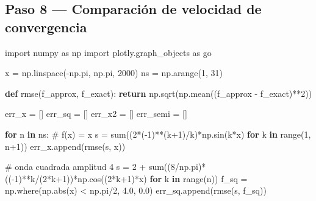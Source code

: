 \documentclass[
  letterpaper,
  DIV=11,
  numbers=noendperiod]{scrreprt}
\newenvironment{Shaded}{\begin{snugshade}}{\end{snugshade}}
\newcommand{\BuiltInTok}[1]{\textcolor[rgb]{0.00,0.23,0.31}{#1}}
\newcommand{\CommentTok}[1]{\textcolor[rgb]{0.37,0.37,0.37}{#1}}
\newcommand{\ControlFlowTok}[1]{\textcolor[rgb]{0.00,0.23,0.31}{\textbf{#1}}}
\newcommand{\DecValTok}[1]{\textcolor[rgb]{0.68,0.00,0.00}{#1}}
\newcommand{\FloatTok}[1]{\textcolor[rgb]{0.68,0.00,0.00}{#1}}
\newcommand{\ImportTok}[1]{\textcolor[rgb]{0.00,0.46,0.62}{#1}}
\newcommand{\KeywordTok}[1]{\textcolor[rgb]{0.00,0.23,0.31}{\textbf{#1}}}
\newcommand{\NormalTok}[1]{\textcolor[rgb]{0.00,0.23,0.31}{#1}}
\newcommand{\OperatorTok}[1]{\textcolor[rgb]{0.37,0.37,0.37}{#1}}
\begin{document}
\subsection{Paso 8 --- Comparación de velocidad de
convergencia}\label{paso-8-comparaciuxf3n-de-velocidad-de-convergencia}

\begin{Shaded}
\begin{Highlighting}[]
\ImportTok{import}\NormalTok{ numpy }\ImportTok{as}\NormalTok{ np}
\ImportTok{import}\NormalTok{ plotly.graph\_objects }\ImportTok{as}\NormalTok{ go}

\NormalTok{x  }\OperatorTok{=}\NormalTok{ np.linspace(}\OperatorTok{{-}}\NormalTok{np.pi, np.pi, }\DecValTok{2000}\NormalTok{)}
\NormalTok{ns }\OperatorTok{=}\NormalTok{ np.arange(}\DecValTok{1}\NormalTok{, }\DecValTok{31}\NormalTok{)}

\KeywordTok{def}\NormalTok{ rmse(f\_approx, f\_exact):}
    \ControlFlowTok{return}\NormalTok{ np.sqrt(np.mean((f\_approx }\OperatorTok{{-}}\NormalTok{ f\_exact)}\OperatorTok{**}\DecValTok{2}\NormalTok{))}

\NormalTok{err\_x   }\OperatorTok{=}\NormalTok{ []}
\NormalTok{err\_sq  }\OperatorTok{=}\NormalTok{ []}
\NormalTok{err\_x2  }\OperatorTok{=}\NormalTok{ []}
\NormalTok{err\_semi }\OperatorTok{=}\NormalTok{ []}

\ControlFlowTok{for}\NormalTok{ n }\KeywordTok{in}\NormalTok{ ns:}
    \CommentTok{\# f(x) = x}
\NormalTok{    s }\OperatorTok{=} \BuiltInTok{sum}\NormalTok{((}\DecValTok{2}\OperatorTok{*}\NormalTok{(}\OperatorTok{{-}}\DecValTok{1}\NormalTok{)}\OperatorTok{**}\NormalTok{(k}\OperatorTok{+}\DecValTok{1}\NormalTok{)}\OperatorTok{/}\NormalTok{k)}\OperatorTok{*}\NormalTok{np.sin(k}\OperatorTok{*}\NormalTok{x) }\ControlFlowTok{for}\NormalTok{ k }\KeywordTok{in} \BuiltInTok{range}\NormalTok{(}\DecValTok{1}\NormalTok{, n}\OperatorTok{+}\DecValTok{1}\NormalTok{))}
\NormalTok{    err\_x.append(rmse(s, x))}

    \CommentTok{\# onda cuadrada amplitud 4}
\NormalTok{    s }\OperatorTok{=} \DecValTok{2} \OperatorTok{+} \BuiltInTok{sum}\NormalTok{((}\DecValTok{8}\OperatorTok{/}\NormalTok{np.pi)}\OperatorTok{*}\NormalTok{((}\OperatorTok{{-}}\DecValTok{1}\NormalTok{)}\OperatorTok{**}\NormalTok{k}\OperatorTok{/}\NormalTok{(}\DecValTok{2}\OperatorTok{*}\NormalTok{k}\OperatorTok{+}\DecValTok{1}\NormalTok{))}\OperatorTok{*}\NormalTok{np.cos((}\DecValTok{2}\OperatorTok{*}\NormalTok{k}\OperatorTok{+}\DecValTok{1}\NormalTok{)}\OperatorTok{*}\NormalTok{x) }\ControlFlowTok{for}\NormalTok{ k }\KeywordTok{in} \BuiltInTok{range}\NormalTok{(n))}
\NormalTok{    f\_sq }\OperatorTok{=}\NormalTok{ np.where(np.}\BuiltInTok{abs}\NormalTok{(x) }\OperatorTok{\textless{}}\NormalTok{ np.pi}\OperatorTok{/}\DecValTok{2}\NormalTok{, }\FloatTok{4.0}\NormalTok{, }\FloatTok{0.0}\NormalTok{)}
\NormalTok{    err\_sq.append(rmse(s, f\_sq))}


\end{Highlighting}
\end{Shaded}
\end{document}
